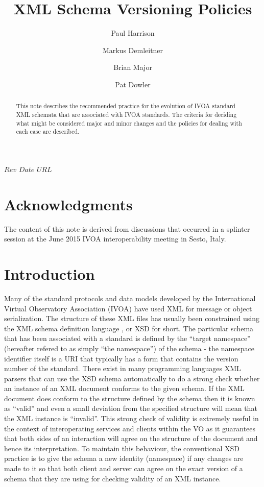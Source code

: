 \documentclass[10pt,a4paper]{ivoa}
\title{XML Schema Versioning Policies}
\author[http://www.ivoa.net/cgi-bin/twiki/bin/view/IVOA/PaulHarrison]{Paul Harrison}
\author[http://www.ivoa.net/cgi-bin/twiki/bin/view/IVOA/MarkusDemleitner]{Markus Demleitner}
\author[http://www.ivoa.net/cgi-bin/twiki/bin/view/IVOA/BrianMajor]{Brian Major}
\author[http://www.ivoa.net/cgi-bin/twiki/bin/view/IVOA/PatDowler]{Pat Dowler}
\begin{document}
\SVN$Rev$
\SVN$Date$
\SVN$URL$

\begin{abstract}
This note describes the recommended practice for the evolution of IVOA
standard XML schemata that are associated with IVOA standards.  The criteria for
deciding what might be considered major and minor changes and the policies for dealing with each case are described.
\end{abstract}



\section*{Acknowledgments}

The content of this note is derived from discussions that occurred in a splinter
session at the June 2015 IVOA interoperability meeting in Sesto, Italy.

\section{Introduction}

Many of the standard protocols and data models developed by
the International Virtual Observatory Association (IVOA) have used XML
\citep{std:XML} for message or object serialization. The structure of
these XML files has
usually been constrained using the XML schema definition language
\citep{std:XSD}, or XSD for short.
The particular schema that has been associated with a standard 
is defined by the ``target namespace'' (hereafter refered to as simply ``the
namespace'') of the schema - the namespace identifier itself is a URI that
typically has a form that contains the version number of the standard. There
exist in many programming languages XML parsers that can use the XSD schema
automatically to do a strong check whether an instance of an XML
document conforms to the given schema. If the XML document does conform to the
structure defined by the schema then it is known as ``valid'' and even a small
deviation from the specified structure will mean that the XML instance is
``invalid''. This strong check of validity is extremely useful in the context of
interoperating services and clients within the VO as it guarantees that both
sides of an interaction will agree on the structure of the document and
hence its interpretation. To maintain
this behaviour, the conventional XSD practice is to give the schema a new
identity (namespace) if any changes are made to it so that both client and
server can agree on the exact version of a schema that they are using for
checking validity of an XML instance.
\end{document}
